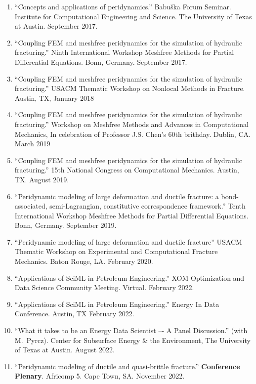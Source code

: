 \begin{enumerate}[resume]
    \item ``Concepts and applications of peridynamics.'' Babu\v{s}ka Forum Seminar. Institute for Computational Engineering and Science. The University of Texas at Austin. September 2017.
    \item ``Coupling FEM and meshfree peridynamics for the simulation of hydraulic fracturing.'' Ninth International Workshop Meshfree Methods for Partial Differential Equations. Bonn, Germany. September 2017.
    \item ``Coupling FEM and meshfree peridynamics for the simulation of hydraulic fracturing.'' USACM Thematic Workshop on Nonlocal Methods in Fracture.  Austin, TX, January 2018
    \item ``Coupling FEM and meshfree peridynamics for the simulation of hydraulic fracturing.'' Workshop on Meshfree Methods and Advances in Computational Mechanics, In celebration of Professor J.S. Chen's 60th brithday.  Dublin, CA.  March 2019
    \item ``Coupling FEM and meshfree peridynamics for the simulation of hydraulic fracturing.'' 15th National Congress on Computational Mechanics. Austin, TX. August 2019.
    \item ``Peridynamic modeling of large deformation and ductile fracture: a bond-associated, semi-Lagrangian, constitutive correspondence framework.'' Tenth International Workshop Meshfree Methods for Partial Differential Equations. Bonn, Germany. September 2019.
    \item ``Peridynamic modeling of large deformation and ductile fracture'' USACM Thematic Workshop on Experimental and Computational Fracture Mechanics. Baton Rouge, LA. February 2020.
    \item ``Applications of SciML in Petroleum Engineering.'' XOM Optimization and Data Science Community Meeting.  Virtual. February 2022.
    \item ``Applications of SciML in Petroleum Engineering.'' Energy In Data Conference. Austin, TX February 2022.
    \item ``What it takes to be an Energy Data Scientist –- A Panel Discussion.'' (with M.\ Pyrcz). Center for Subsurface Energy \& the Environment, The University of Texas at Austin.  August 2022.
    \item ``Peridynamic modeling of ductile and quasi-brittle fracture.''  {\bf Conference Plenary}. Africomp 5. Cape Town, SA.  November 2022.
\end{enumerate}

